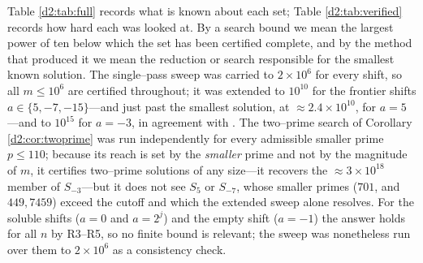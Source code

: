 \documentclass[a4paper]{article}
\theoremstyle{plain}
\theoremstyle{definition}
\theoremstyle{remark}
\begin{document}
Table \ref{d2:tab:full} records what is known about each set; Table \ref{d2:tab:verified} records how hard each was looked at. By a search bound we mean the largest power of ten below which the set has been certified complete, and by the method that produced it we mean the reduction or search responsible for the smallest known solution. The single--pass sweep was carried to $2\times10^{6}$ for every shift, so all $m\le10^{6}$ are certified throughout; it was extended to $10^{10}$ for the frontier shifts $a\in\{5,-7,-15\}$---and just past the smallest solution, at $\approx2.4\times10^{10}$, for $a=5$---and to $10^{15}$ for $a=-3$, in agreement with \cite{d2:oeis}. The two--prime search of Corollary \ref{d2:cor:twoprime} was run independently for every admissible smaller prime $p\le110$; because its reach is set by the \emph{smaller} prime and not by the magnitude of $m$, it certifies two--prime solutions of any size---it recovers the $\approx3\times10^{18}$ member of $S_{-3}$---but it does not see $S_5$ or $S_{-7}$, whose smaller primes ($701$, and $449,7459$) exceed the cutoff and which the extended sweep alone resolves. For the soluble shifts ($a=0$ and $a=2^{j}$) and the empty shift ($a=-1$) the answer holds for all $n$ by R3--R5, so no finite bound is relevant; the sweep was nonetheless run over them to $2\times10^{6}$ as a consistency check.
\end{document}
